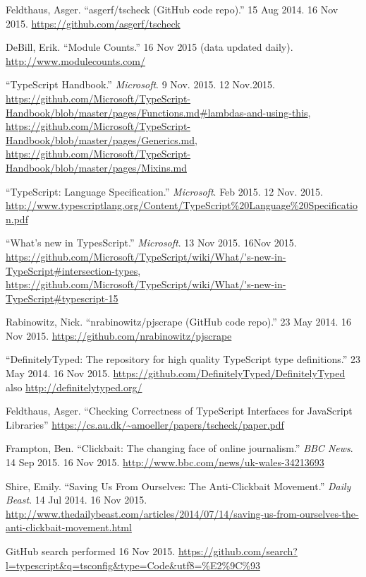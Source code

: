\documentclass[]{article}
\begin{document}
\begin{thebibliography}{15}
Feldthaus, Asger. ``asgerf/tscheck (GitHub code repo).'' 15 Aug
2014. 16 Nov 2015. \url{https://github.com/asgerf/tscheck}

DeBill, Erik. ``Module Counts.'' 16 Nov 2015 (data updated
daily). \url{http://www.modulecounts.com/}

``TypeScript Handbook.'' \emph{Microsoft}. 9 Nov. 2015. 12 Nov.2015.
\url{https://github.com/Microsoft/TypeScript-Handbook/blob/master/pages/Functions.md\#lambdas-and-using-this}, \url{https://github.com/Microsoft/TypeScript-Handbook/blob/master/pages/Generics.md}, \url{https://github.com/Microsoft/TypeScript-Handbook/blob/master/pages/Mixins.md}

``TypeScript: Language Specification.'' \emph{Microsoft}. Feb
2015. 12 Nov. 2015.
\url{http://www.typescriptlang.org/Content/TypeScript\%20Language\%20Specification.pdf}

``What's new in TypesScript.'' \emph{Microsoft}. 13 Nov 2015. 16Nov 2015.
\url{https://github.com/Microsoft/TypeScript/wiki/What/'s-new-in-TypeScript\#intersection-types}, \url{https://github.com/Microsoft/TypeScript/wiki/What/'s-new-in-TypeScript\#typescript-15}

Rabinowitz, Nick. ``nrabinowitz/pjscrape (GitHub code repo).'' 23
May 2014. 16 Nov 2015. \url{https://github.com/nrabinowitz/pjscrape}

``DefinitelyTyped: The repository for high quality TypeScript
type definitions.'' 23 May 2014. 16 Nov 2015.
\url{https://github.com/DefinitelyTyped/DefinitelyTyped} also
\url{http://definitelytyped.org/}

Feldthaus, Asger. ``Checking Correctness of TypeScript
Interfaces for JavaScript Libraries''
\url{https://cs.au.dk/~amoeller/papers/tscheck/paper.pdf}

Frampton, Ben. ``Clickbait: The changing face of online
journalism.'' \emph{BBC News}. 14 Sep 2015. 16 Nov 2015.
\url{http://www.bbc.com/news/uk-wales-34213693}

 Shire, Emily. ``Saving Us From Ourselves: The Anti-Clickbait
Movement.'' \emph{Daily Beast}. 14 Jul 2014. 16 Nov 2015.
\url{http://www.thedailybeast.com/articles/2014/07/14/saving-us-from-ourselves-the-anti-clickbait-movement.html}

GitHub search performed 16 Nov 2015.
\url{https://github.com/search?l=typescript\&q=tsconfig\&type=Code\&utf8=\%E2\%9C\%93}
\end{thebibliography}
\end{document}
